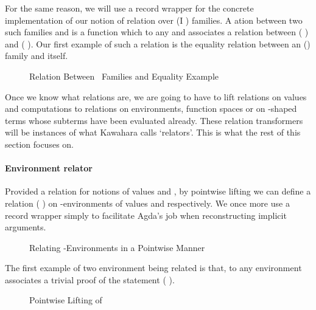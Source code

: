 For the same reason, we will use a record wrapper for the concrete
implementation of our notion of relation over (I )
families. A ation between two such families  and 
is a function which to any  and  associates a relation
between (  ) and (  ). Our first
example of such a relation is  the equality relation between
an () family  and itself.

\begin{figure}[h]
\begin{minipage}[t]{0.65\textwidth}
\end{minipage}
\begin{minipage}[t]{0.25\textwidth}
\end{minipage}
\caption{Relation Between ~Families and Equality Example\label{ex:fam-eq}}
\label{fig:reldef}
\end{figure}

Once we know what relations are, we are going to have to lift relations on values
and computations to relations on environments,  function spaces or
on -shaped terms whose subterms have been evaluated already. These relation
transformers will be instances of what Kawahara calls `relators'.
This is what the rest of this section focuses on.


\paragraph{Environment relator}
Provided a relation  for notions of values  and , by
pointwise lifting we can define a relation {(  )} on
-environments of values  and  respectively. We once more
use a record wrapper simply to facilitate Agda's job when reconstructing
implicit arguments.

\begin{figure}[h]
  \caption{Relating -Environments in a Pointwise Manner
    \label{defn:Env-rel}}
\end{figure}

The first example of two environment being related is  that, to any
environment  associates a trivial proof of the statement
{(    )}.

\begin{figure}[h]
\caption{Pointwise Lifting of \label{defn:reflR}}
\end{figure}

